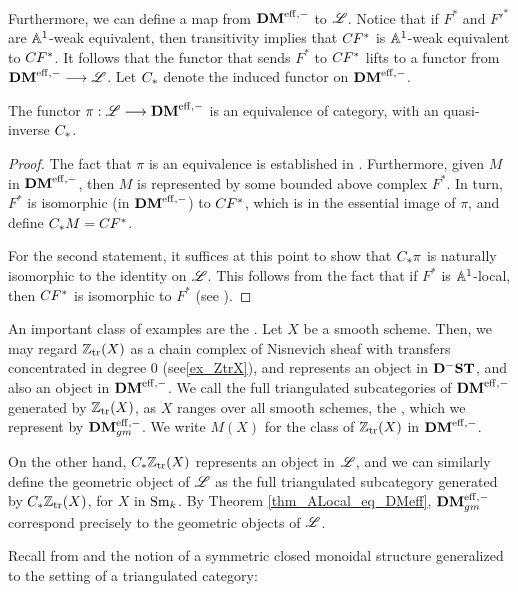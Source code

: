 Furthermore, we can define a map from $\DMeff$ to $\ALocal$. 
Notice that if $F^*$ and ${F'}^*$ are $\A^1$-weak equivalent, then
transitivity implies that $\suslC[] F^*$ is $\A^1$-weak equivalent 
to $\suslC[] F^*$. It follows that the functor that sends $F^*$
to $\suslC[] F^*$ lifts to a functor from $\DMeff \to \ALocal$.
Let $\suslC$ denote the induced functor on $\DMeff$.

\begin{thm}\label{thm_ALocal_eq_DMeff}
The functor $\pi: \ALocal \to \DMeff$ is an equivalence of 
category, with an quasi-inverse $\suslC$.
\end{thm}

\begin{proof}
The fact that $\pi$ is an equivalence is established in
\cite[Theorem 14.11]{MVW}. Furthermore, given $M$ in
$\DMeff$, then $M$ is represented by some bounded above complex 
$F^*$. In turn, $F^*$ is isomorphic (in $\DMeff$) to $\suslC[] 
F^*$, which is in the essential image of $\pi$, and define
$\suslC M = \suslC[] F^*$. 

For the second statement, it suffices at this point to show that 
$\suslC \pi$ is naturally isomorphic to the identity on $\ALocal$. 
This follows from the fact that if $F^*$ is $\A^1$-local, then 
$\suslC[] F^*$ is isomorphic to $F^*$ (see \cite[Corollary 
14.9]{MVW}).
\end{proof}

\begin{ex}\label{ex_geo_obj}
An important class of examples are the . 
Let $X$ be a smooth scheme. Then, we may regard $\Ztr(X)$ as a
chain complex of Nisnevich sheaf with transfers concentrated
in degree 0 (see\ref{ex_ZtrX}), and represents an object in
$\DShCor$, and also an object in $\DMeff$. We call the full
triangulated subcategories of $\DMeff$ generated by $\Ztr(X)$, as 
$X$ ranges over all smooth schemes, the , which we represent by $\DMeffgm$. We write $M(X)$ for 
the class of $\Ztr(X)$ in $\DMeff$.

On the other hand, $\suslC \Ztr(X)$ represents an object in 
$\ALocal$, and we can similarly define the geometric object of 
$\ALocal$ as the full triangulated subcategory generated by
$\suslC \Ztr(X)$, for $X$ in $\Sm$. By Theorem 
\ref{thm_ALocal_eq_DMeff}, $\DMeffgm$ correspond precisely to
the geometric objects of $\ALocal$.
\end{ex}

Recall from \cite[1.13]{MK} and \cite[8A.1]{MVW} the notion of a 
symmetric closed monoidal structure generalized to the setting of 
a triangulated category:

